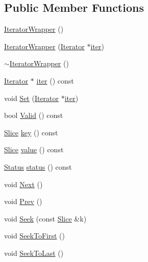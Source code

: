 \subsection*{Public Member Functions}
\begin{DoxyCompactItemize}
\item 
\hyperlink{classleveldb_1_1_iterator_wrapper_a8fba8a05ace9ed7a4f0a32f2c8eab73d}{Iterator\+Wrapper} ()
\item 
\hyperlink{classleveldb_1_1_iterator_wrapper_ab4714f21809e357b4d5b6bdbec4fe98f}{Iterator\+Wrapper} (\hyperlink{classleveldb_1_1_iterator}{Iterator} $\ast$\hyperlink{classleveldb_1_1_iterator_wrapper_a692d580f1e3deb50cd3dc52e68c6d83e}{iter})
\item 
\hyperlink{classleveldb_1_1_iterator_wrapper_acbee07d5d34bbd2e2b5590d77a4e105c}{$\sim$\+Iterator\+Wrapper} ()
\item 
\hyperlink{classleveldb_1_1_iterator}{Iterator} $\ast$ \hyperlink{classleveldb_1_1_iterator_wrapper_a692d580f1e3deb50cd3dc52e68c6d83e}{iter} () const 
\item 
void \hyperlink{classleveldb_1_1_iterator_wrapper_ae14dd8ac682dd596ba2a3d2407e1a4fd}{Set} (\hyperlink{classleveldb_1_1_iterator}{Iterator} $\ast$\hyperlink{classleveldb_1_1_iterator_wrapper_a692d580f1e3deb50cd3dc52e68c6d83e}{iter})
\item 
bool \hyperlink{classleveldb_1_1_iterator_wrapper_a42a21e1d067c50de69f1385ea65e0fc1}{Valid} () const 
\item 
\hyperlink{classleveldb_1_1_slice}{Slice} \hyperlink{classleveldb_1_1_iterator_wrapper_a1c37e4c009e2d3b58f2085022c966470}{key} () const 
\item 
\hyperlink{classleveldb_1_1_slice}{Slice} \hyperlink{classleveldb_1_1_iterator_wrapper_ae9a12c8e016afc20b493de0bfcdaac21}{value} () const 
\item 
\hyperlink{classleveldb_1_1_status}{Status} \hyperlink{classleveldb_1_1_iterator_wrapper_a1aaa880e200db3226cbf1e7373ffb6a8}{status} () const 
\item 
void \hyperlink{classleveldb_1_1_iterator_wrapper_abcd48a4cbd0466c8566f2c12ad8a1038}{Next} ()
\item 
void \hyperlink{classleveldb_1_1_iterator_wrapper_abfd17dc9aef7f4d59603b2edab2ffb77}{Prev} ()
\item 
void \hyperlink{classleveldb_1_1_iterator_wrapper_a5dc3cd4e168e8ec0ab3a094cf36ae5d0}{Seek} (const \hyperlink{classleveldb_1_1_slice}{Slice} \&k)
\item 
void \hyperlink{classleveldb_1_1_iterator_wrapper_a06923cd8c121cf7491cc2b043a479445}{Seek\+To\+First} ()
\item 
void \hyperlink{classleveldb_1_1_iterator_wrapper_ae09179113b28aa3ea1da70b3a7a5f04b}{Seek\+To\+Last} ()
\end{DoxyCompactItemize}
